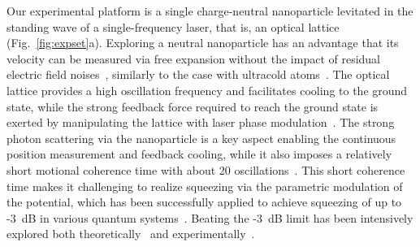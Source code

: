\documentclass[aps, prl, 
amsmath, showpacs, preprintnumbers, twocolumn, amssymb, amsmath, superscriptaddress]{revtex4-1}
\begin{document}
Our experimental platform is a single charge-neutral nanoparticle levitated in the standing wave of a single-frequency laser, that is, an optical lattice~\cite{kamba2023nanoscale} (Fig.~\ref{fig:expset}a). Exploring a neutral nanoparticle has an advantage that its velocity can be measured via free expansion without the impact of residual electric field noises~\cite{kamba2023revealing}, similarly to the case with ultracold atoms~\cite{bloch2008many}. The optical lattice provides a high oscillation frequency and facilitates cooling to the ground state, while the strong feedback force required to reach the ground state is exerted by manipulating the lattice with laser phase modulation~\cite{kamba2022optical}.  
The strong photon scattering via the nanoparticle is a key aspect enabling the continuous position measurement and feedback cooling, while it also imposes a relatively short motional coherence time with about 20 oscillations~\cite{delic2020cooling}. This short coherence time makes it challenging to realize squeezing via the parametric modulation of the potential, which has been successfully applied to achieve squeezing of up to -3~dB in various quantum systems~\cite{rugar1991mechanical,zalalutdinov2001optically,karabalin2010efficient,suh2010parametric}. Beating the -3~dB limit has been intensively explored both theoretically~\cite{clerk2008back,lu2015steady,agarwal2016strong} and experimentally~\cite{lei2016quantum}. 

\end{document}

